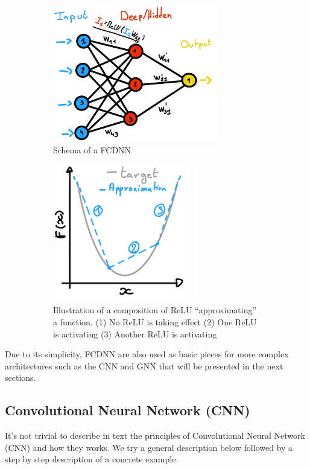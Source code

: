 \documentclass[../main.tex]{subfiles}
\begin{document}
\begin{figure}[ht]
  \begin{subfigure}[t]{0.48\textwidth}
    \centering
    \includegraphics[height=6cm]{images/ml/fcdnn_scheme.jpg}
    \caption{Schema of a FCDNN}
    \label{fig:ml:fcdnn}
  \end{subfigure}
  \hfill
  \begin{subfigure}[t]{0.48\textwidth}
    \centering
    \includegraphics[height=6cm]{images/ml/relu_approx.png}
    \caption{Illustration of a composition of ReLU ``approximating'' a function. (1) No ReLU is taking effect (2) One ReLU is activating (3) Another ReLU is activating}
    \label{fig:ml:relu-mimic}
  \end{subfigure}
  \caption{}
\end{figure}

Due to its simplicity, FCDNN are also used as basic pieces for more complex architectures such as the CNN and GNN that will be presented in the next sections.

\subsection{Convolutional Neural Network (CNN)}
\label{sec:ml:cnn}

It's not trivial to describe in text the principles of Convolutional Neural Network (CNN) and how they works. We try a general description below followed by a step by step description of a concrete example.
\end{document}
